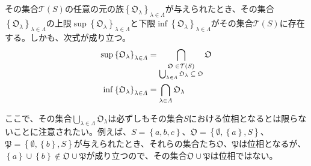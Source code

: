 \documentclass[dvipdfmx]{jsarticle}
\begin{document}
\begin{thm}\label{8.1.2.4}
その集合$\mathcal{T}(S)$の任意の元の族$\left\{ \mathfrak{O}_{\lambda} \right\}_{\lambda \in \varLambda}$が与えられたとき、その集合$\left\{ \mathfrak{O}_{\lambda} \right\}_{\lambda \in \varLambda}$の上限$\sup\left\{ \mathfrak{O}_{\lambda} \right\}_{\lambda \in \varLambda}と下限\inf\left\{ \mathfrak{O}_{\lambda} \right\}_{\lambda \in \varLambda}がその集合\mathcal{T}(S)$に存在する。しかも、次式が成り立つ。
\begin{align*}
\sup\left\{ \mathfrak{O}_{\lambda} \right\}_{\lambda \in \varLambda} &= \bigcap_{\scriptsize \begin{matrix}
\mathfrak{O \in}\mathcal{T}(S) \\
\bigcup_{\lambda \in \varLambda} \mathfrak{O}_{\lambda}\subseteq \mathfrak{O} \\
\end{matrix}} \mathfrak{O}\\
\inf\left\{ \mathfrak{O}_{\lambda} \right\}_{\lambda \in \varLambda} &= \bigcap_{\lambda \in \varLambda} \mathfrak{O}_{\lambda}
\end{align*}
\end{thm}\par
ここで、その集合$\bigcup_{\lambda \in \varLambda} \mathfrak{O}_{\lambda}$は必ずしもその集合$S$における位相となるとは限らないことに注意されたい。例えば、$S = \left\{ a,b,c \right\}$、$\mathfrak{O} = \left\{ \emptyset,\left\{ a \right\},S \right\}$、$\mathfrak{P} = \left\{ \emptyset,\left\{ b \right\},S \right\}$が与えられたとき、それらの集合たち$\mathfrak{O}$、$\mathfrak{P}$は位相となるが、$\left\{ a \right\} \cup \left\{ b \right\} \notin \mathfrak{O} \cup \mathfrak{P}$が成り立つので、その集合$\mathfrak{O \cup P}$は位相ではない。
\end{document}
